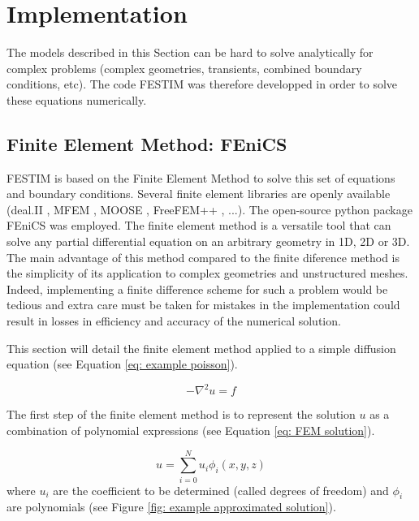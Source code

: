 \section{Implementation}


The models described in this Section can be hard to solve analytically for complex problems (complex geometries, transients, combined boundary conditions, etc).
The code FESTIM  was therefore developped in order to solve these equations numerically.

\subsection{Finite Element Method: FEniCS}
FESTIM is based on the Finite Element Method to solve this set of equations and boundary conditions.
Several finite element libraries are openly available (deal.II , MFEM , MOOSE , FreeFEM++ , ...).
The open-source python package FEniCS  was employed.
The finite element method is a versatile tool that can solve any partial differential equation on an arbitrary geometry in 1D, 2D or 3D.
The main advantage of this method compared to the finite diference method is the simplicity of its application to complex geometries and unstructured meshes.
Indeed, implementing a finite difference scheme for such a problem would be tedious and extra care must be taken for mistakes in the implementation could result in losses in efficiency and accuracy of the numerical solution.

This section will detail the finite element method applied to a simple diffusion equation (see Equation \ref{eq: example poisson}).

\begin{equation}
    -\nabla^2 u = f
    \label{eq: example poisson}
\end{equation}

The first step of the finite element method is to represent the solution $u$ as a combination of polynomial expressions (see Equation \ref{eq: FEM solution}).

\begin{equation}
    u = \sum^N_{i=0}u_i \phi_i(x, y, z)
    \label{eq: FEM solution}
\end{equation}
where $u_i$ are the coefficient to be determined (called degrees of freedom) and $\phi_i$ are polynomials (see Figure \ref{fig: example approximated solution}).

